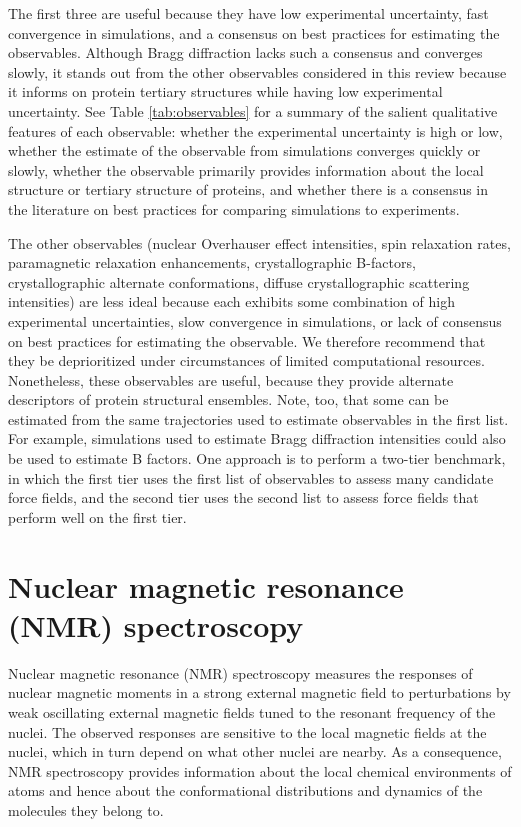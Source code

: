 \documentclass[9pt,review]{livecoms}
\begin{document}
The first three are useful because they have low experimental uncertainty, fast convergence in simulations, and a consensus on best practices for estimating the observables.
Although Bragg diffraction lacks such a consensus and converges slowly, it stands out from the other observables considered in this review because it informs on protein tertiary structures while having low experimental uncertainty.
See Table \ref{tab:observables} for a summary of the salient qualitative features of each observable: whether the experimental uncertainty is high or low, whether the estimate of the observable from simulations converges quickly or slowly, whether the observable primarily provides information about the local structure or tertiary structure of proteins, and whether there is a consensus in the literature on best practices for comparing simulations to experiments.

The other observables (nuclear Overhauser effect intensities, spin relaxation rates, paramagnetic relaxation enhancements, crystallographic B-factors, crystallographic alternate conformations, diffuse crystallographic scattering intensities) are less ideal because each exhibits some combination of high experimental uncertainties, slow convergence in simulations, or lack of consensus on best practices for estimating the observable.
We therefore recommend that they be deprioritized under circumstances of limited computational resources.
Nonetheless, these observables are useful, because they provide alternate descriptors of protein structural ensembles.
Note, too, that some can be estimated from the same trajectories used to estimate observables in the first list.
For example, simulations used to estimate Bragg diffraction intensities could also be used to estimate B factors.
One approach is to perform a two-tier benchmark, in which the first tier uses the first list of observables to assess many candidate force fields, and the second tier uses the second list to assess force fields that perform well on the first tier.

\section{Nuclear magnetic resonance (NMR) spectroscopy}
\label{sec:nmr}

Nuclear magnetic resonance (NMR) spectroscopy measures the responses of nuclear magnetic moments in a strong external magnetic field to perturbations by weak oscillating external magnetic fields tuned to the resonant frequency of the nuclei.
The observed responses are sensitive to the local magnetic fields at the nuclei, which in turn depend on what other nuclei are nearby.
As a consequence, NMR spectroscopy provides information about the local chemical environments of atoms and hence about the conformational distributions and dynamics of the molecules they belong to.
\end{document}
